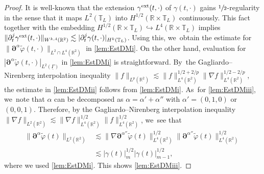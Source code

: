 \documentclass[JEP,XML,SOM,Unicode,NoFloatCountersInSection,published]{cedram}
\newcommand{\R}{{\mathbb R}}
\newcommand{\dt}{\partial_t}
\newcommand{\ul}[1]{\underline{#1}}
\newcommand{\itGamma}{\mathit{\Gamma}}
\theoremstyle{definition}
\begin{document}
\begin{proof}
It is well-known that the extension $\gamma^{\rm ext}(t,\cdot)$ of $\gamma(t,\cdot)$ gains $\sfrac12$-regularity in the sense that
it maps $L^2(\mathbb{T}_L)$ into $H^{1/2}(\R\times\mathbb{T}_L)$ continuously.
This fact together with the embedding $H^{1/2}(\R\times\mathbb{T}_L) \hookrightarrow L^4(\R\times\mathbb{T}_L)$ implies
$\|\dt^j\gamma^{\rm ext}(t,\cdot)\|_{W^{k,4}(\R^2)} \lesssim |\dt^j\gamma(t,\cdot)|_{H^k(\mathbb{T}_L)}$.
Using this, we~obtain the estimate for $\|\bm{\partial}^\alpha\widetilde{\varphi}(t,\cdot)\|_{L^2\cap L^4(\R^2)}$ in \eqref{lem:EstDMi}.
On the other hand, evaluation for $|\bm{\partial}^\alpha\widetilde{\varphi}(t,\cdot)|_{L^2(\ul{\itGamma})}$ in \eqref{lem:EstDMi} is straightforward. By~the Gagliardo--Nirenberg interpolation inequality $\|f\|_{L^p(\R^2)}\lesssim \|f\|_{L^4(\R^2)}^{1/2+2/p}\|\nabla f\|_{L^4(\R^2)}^{1/2-2/p}$,
the estimate in \eqref{lem:EstDMii} follows from \eqref{lem:EstDMi}. As~for \eqref{lem:EstDMiii}, we~note that $\alpha$ can be decomposed as $\alpha=\alpha'+\alpha''$ with $\alpha'=(0,1,0)$ or $(0,0,1)$.
Therefore, by the Gagliardo--Nirenberg interpolation inequality $\|\nabla f\|_{L^2(\R^2)} \lesssim \|\nabla f\|_{L^4(\R^2)}^{1/2} \|f\|_{L^4(\R^2)}^{1/2}$, we~see that
\begin{align*}
\|\bm{\partial}^\alpha\widetilde{\varphi}(t)\|_{L^2(\R^2)}
&\lesssim \|\nabla\bm{\partial}^{\alpha''}\widetilde{\varphi}(t)\|_{L^4(\R^2)}^{1/2} \|\bm{\partial}^{\alpha''}\widetilde{\varphi}(t)\|_{L^4(\R^2)}^{1/2} \\
&\lesssim |\gamma(t)|_m^{1/2} |\gamma(t)|_{m-1}^{1/2},
\end{align*}
where we used \eqref{lem:EstDMi}.
This shows \eqref{lem:EstDMiii}.
\end{proof}
\end{document}
